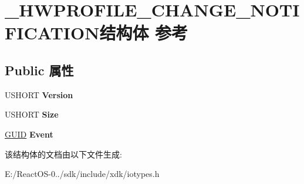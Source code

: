 \hypertarget{struct___h_w_p_r_o_f_i_l_e___c_h_a_n_g_e___n_o_t_i_f_i_c_a_t_i_o_n}{}\section{\+\_\+\+H\+W\+P\+R\+O\+F\+I\+L\+E\+\_\+\+C\+H\+A\+N\+G\+E\+\_\+\+N\+O\+T\+I\+F\+I\+C\+A\+T\+I\+O\+N结构体 参考}
\label{struct___h_w_p_r_o_f_i_l_e___c_h_a_n_g_e___n_o_t_i_f_i_c_a_t_i_o_n}
\subsection*{Public 属性}
\begin{DoxyCompactItemize}
\item 
\mbox{\label{struct___h_w_p_r_o_f_i_l_e___c_h_a_n_g_e___n_o_t_i_f_i_c_a_t_i_o_n_af0e13b080a57c794fe9924581c06babf}} 
U\+S\+H\+O\+RT {\bfseries Version}
\item 
\mbox{\label{struct___h_w_p_r_o_f_i_l_e___c_h_a_n_g_e___n_o_t_i_f_i_c_a_t_i_o_n_ae9fcf82253e4ba5f3ad36f8861eaad36}} 
U\+S\+H\+O\+RT {\bfseries Size}
\item 
\mbox{\label{struct___h_w_p_r_o_f_i_l_e___c_h_a_n_g_e___n_o_t_i_f_i_c_a_t_i_o_n_a1024408ef471c7306b046ebc67385f54}} 
\hyperlink{interface_g_u_i_d}{G\+U\+ID} {\bfseries Event}
\end{DoxyCompactItemize}


该结构体的文档由以下文件生成\+:\begin{DoxyCompactItemize}
\item 
E\+:/\+React\+O\+S-\/0../sdk/include/xdk/iotypes.\+h\end{DoxyCompactItemize}
